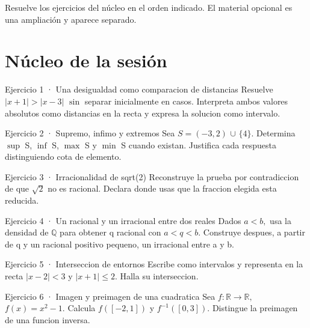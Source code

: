 \documentclass[10pt,a4paper,oneside,openany]{book}
\begin{document}
Resuelve los ejercicios del núcleo en el orden indicado. El material opcional es una ampliación y aparece separado.
\section*{Núcleo de la sesión}
\begin{PSevenExerciseFixed}{Ejercicio 1 · Una desigualdad como comparacion de distancias}
Resuelve \(|x+1|>|x-3|\) \(\sin\) separar inicialmente en casos. Interpreta ambos valores absolutos como distancias en la recta y expresa la solucion como intervalo.
\end{PSevenExerciseFixed}
\begin{PSevenExerciseFixed}{Ejercicio 2 · Supremo, infimo y extremos}
Sea \(S=(-3,2)\) \(\cup \) \(\{4\}\). Determina \(\sup\) S, \(\inf\) S, \(\max\) S y \(\min\) S cuando existan. Justifica cada respuesta distinguiendo cota de elemento.
\end{PSevenExerciseFixed}
\begin{PSevenExerciseFixed}{Ejercicio 3 · Irracionalidad de sqrt(2)}
Reconstruye la prueba por contradiccion de que \(\sqrt{2}\) no es racional. Declara donde usas que la fraccion elegida esta reducida.
\end{PSevenExerciseFixed}
\begin{PSevenExerciseFixed}{Ejercicio 4 · Un racional y un irracional entre dos reales}
Dados \(a<b,\) usa la densidad de \(\mathbb{Q}\) para obtener q racional con \(a<q<b\). Construye despues, a partir de q y un racional positivo pequeno, un irracional entre a y b.
\end{PSevenExerciseFixed}
\begin{PSevenExerciseFixed}{Ejercicio 5 · Interseccion de entornos}
Escribe como intervalos y representa en la recta \(|x-2|<3\) y \(|x+1|\le 2\). Halla su interseccion.
\end{PSevenExerciseFixed}
\begin{PSevenExerciseFixed}{Ejercicio 6 · Imagen y preimagen de una cuadratica}
Sea \(f:\mathbb{R}\to \mathbb{R},\) \(f(x)=x^{2}-1\). Calcula \(f([-2,1])\) y \(f^{-1}([0,3])\). Distingue la preimagen de una funcion inversa.
\end{PSevenExerciseFixed}
\end{document}
